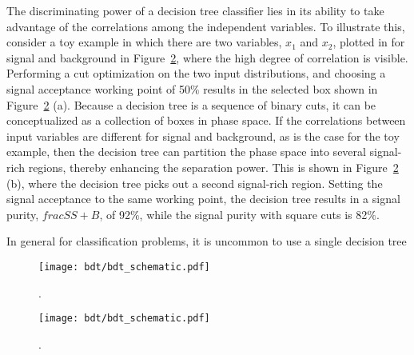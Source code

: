 The discriminating power of a decision tree classifier lies in its ability to take advantage of
the correlations among the independent variables. To illustrate this,
consider a toy example in which there are two variables, $x_1$ and
$x_2$, plotted in for signal and background in
Figure~\ref{chap:bdt:fig:x1_x2}, where the high degree of
correlation is visible. Performing a cut optimization on the two input
distributions, and choosing a signal acceptance working point of
50$\%$ results in the selected box shown in
Figure~\ref{chap:bdt:fig:x1_x2} (a). Because a decision tree is a
sequence of binary cuts, it can be conceptualized as a collection of
boxes in phase space. If the correlations between input variables are
different for signal and background, as is the case for the toy
example, then the decision tree can partition the phase space into
several signal-rich regions, thereby enhancing the separation
power. This is shown in Figure~\ref{chap:bdt:fig:x1_x2} (b), where the
decision tree picks out a second signal-rich region. Setting the
signal acceptance to the same working point, the decision tree results
in a signal purity, $frac{S}{S+B}$, of 92$\%$, while the signal purity
with square cuts is 82$\%$.

In general for classification problems, it is uncommon to use a single
decision tree

\begin{figure}[h]
    \centering
    \texttt{[image: bdt/bdt\_schematic.pdf]}
    \caption[Schematic of a boosted decision tree.~\cite{bib:Therhaag:2009dp}].
\label{chap:bdt:fig:bdt_schem}
\end{figure}

\begin{figure}[h]
    \centering
    \texttt{[image: bdt/bdt\_schematic.pdf]}
    \caption[Schematic of a boosted decision tree.~\cite{bib:Therhaag:2009dp}].
\label{chap:bdt:fig:x1_x2}
\end{figure}
